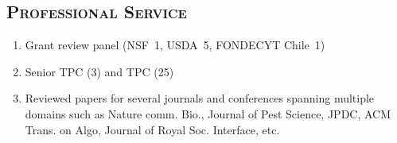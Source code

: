 \documentclass[margin,10pt]{res} %
\begin{document}
\begin{resume}
\section{\textnormal{\textsc{Professional Service}}}
\begin{enumerate}[$\circ$]
    \iftoggle{compact}{}{
    \item Professional service: 
    \begin{itemize}
    }
        \item Grant review panel (NSF~1, USDA~5, FONDECYT Chile~1)
        \item Senior TPC (3) and TPC (25)
        \item Reviewed papers for several journals and conferences
        spanning multiple domains such as Nature comm. Bio., Journal of
        Pest Science, JPDC, ACM Trans. on Algo, Journal of Royal Soc.
        Interface, etc.
        \iftoggle{compact}{}{
    \end{itemize}
    \item Biocomplexity Institute:
    \begin{itemize}
        \item Student and postdoc hiring committee in NSSAC 2018--2020.
        \item Student and postdoc hiring committee in NDSSL 2017--2018.
\item Member of graduate students admission team in NDSSL for the Fall'16
admissions
    \end{itemize}
}
\end{enumerate}

\iftoggle{compact}{}{
}
\end{resume}
\end{document}
